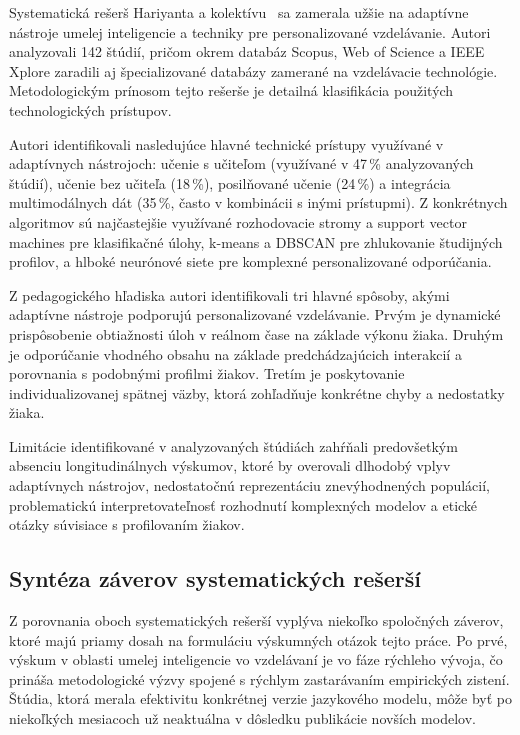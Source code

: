 Systematická rešerš Hariyanta a kolektívu~\cite{hariyanto2025adaptive} sa zamerala užšie na adaptívne nástroje umelej inteligencie a techniky pre personalizované vzdelávanie. Autori analyzovali 142 štúdií, pričom okrem databáz Scopus, Web of Science a IEEE Xplore zaradili aj špecializované databázy zamerané na vzdelávacie technológie. Metodologickým prínosom tejto rešerše je detailná klasifikácia použitých technologických prístupov.

Autori identifikovali nasledujúce hlavné technické prístupy využívané v adaptívnych nástrojoch: učenie s učiteľom (využívané v 47\,\% analyzovaných štúdií), učenie bez učiteľa (18\,\%), posilňované učenie (24\,\%) a integrácia multimodálnych dát (35\,\%, často v kombinácii s inými prístupmi). Z konkrétnych algoritmov sú najčastejšie využívané rozhodovacie stromy a support vector machines pre klasifikačné úlohy, k-means a DBSCAN pre zhlukovanie študijných profilov, a hlboké neurónové siete pre komplexné personalizované odporúčania.

Z pedagogického hľadiska autori identifikovali tri hlavné spôsoby, akými adaptívne nástroje podporujú personalizované vzdelávanie. Prvým je dynamické prispôsobenie obtiažnosti úloh v reálnom čase na základe výkonu žiaka. Druhým je odporúčanie vhodného obsahu na základe predchádzajúcich interakcií a porovnania s podobnými profilmi žiakov. Tretím je poskytovanie individualizovanej spätnej väzby, ktorá zohľadňuje konkrétne chyby a nedostatky žiaka.

Limitácie identifikované v analyzovaných štúdiách zahŕňali predovšetkým absenciu longitudinálnych výskumov, ktoré by overovali dlhodobý vplyv adaptívnych nástrojov, nedostatočnú reprezentáciu znevýhodnených populácií, problematickú interpretovateľnosť rozhodnutí komplexných modelov a etické otázky súvisiace s profilovaním žiakov.


\subsection{Syntéza záverov systematických rešerší}

Z porovnania oboch systematických rešerší vyplýva niekoľko spoločných záverov, ktoré majú priamy dosah na formuláciu výskumných otázok tejto práce. Po prvé, výskum v oblasti umelej inteligencie vo vzdelávaní je vo fáze rýchleho vývoja, čo prináša metodologické výzvy spojené s rýchlym zastarávaním empirických zistení. Štúdia, ktorá merala efektivitu konkrétnej verzie jazykového modelu, môže byť po niekoľkých mesiacoch už neaktuálna v dôsledku publikácie novších modelov.

